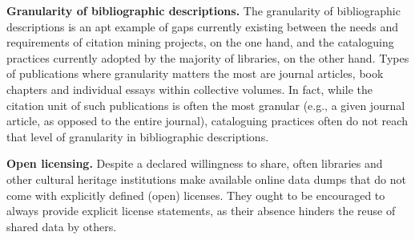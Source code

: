 \textbf{Granularity of bibliographic descriptions.} The granularity of bibliographic descriptions is an apt example of gaps currently existing between the needs and requirements of citation mining projects, on the one hand, and the cataloguing practices currently adopted by the majority of libraries, on the other hand. Types of publications where granularity matters the most are journal articles, book chapters and individual essays within collective volumes. In fact, while the citation unit of such publications is often the most granular (e.g., a given journal article, as opposed to the entire journal), cataloguing practices often do not reach that level of granularity in bibliographic descriptions. 

\textbf{Open licensing.} Despite a declared willingness to share, often libraries and other cultural heritage institutions make available online data dumps that do not come with explicitly defined (open) licenses. They ought to be encouraged to always provide explicit license statements, as their absence hinders the reuse of shared data by others.